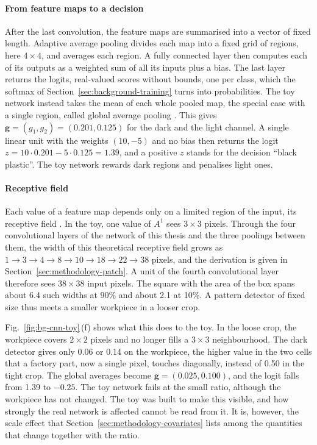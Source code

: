 \paragraph{From feature maps to a decision}
After the last convolution, the feature maps are summarised into a vector of fixed
length. Adaptive average pooling divides each map into a fixed grid of regions, here
$4 \times 4$, and averages each region. A fully connected layer then computes each of
its outputs as a weighted sum of all its inputs plus a bias. The last layer returns the
logits, real-valued scores without bounds, one per class, which the softmax of
Section~\ref{sec:background-training} turns into probabilities. The toy network instead
takes the mean of each whole pooled map, the special case with a single region, called
global average pooling \citep{lin2014network}. This gives
$\bm{g} = (g_1, g_2) = (0.201, 0.125)$ for the dark and the light channel. A single linear
unit with the weights $(10, -5)$ and no bias then returns the logit
$z = 10 \cdot 0.201 - 5 \cdot 0.125 = 1.39$, and a positive $z$ stands for the decision
``black plastic''. The toy network rewards dark regions and penalises light
ones.

\paragraph{Receptive field}
Each value of a feature map depends only on a limited region of the input, its receptive
field \citep{araujo2019computing}. In the toy, one value of $A^1$ sees $3 \times 3$
pixels. Through the four
convolutional layers of the network of this thesis and the three poolings between them,
the width of this theoretical receptive field grows as
$1 \to 3 \to 4 \to 8 \to 10 \to 18 \to 22 \to 38$ pixels, and the
derivation is given in Section~\ref{sec:methodology-patch}. A unit of the fourth
convolutional layer therefore sees $38 \times 38$ input pixels. The square with the area
of the box spans about 6.4 such widths at 90\% and about 2.1 at 10\%. A pattern detector
of fixed size thus meets a smaller workpiece in a looser crop.

Fig.~\ref{fig:bg-cnn-toy}\,(f) shows what this does to the toy. In the loose crop, the
workpiece covers $2 \times 2$ pixels and no longer fills a $3 \times 3$ neighbourhood.
The dark detector gives only 0.06 or 0.14 on the workpiece, the higher value in the two
cells that a factory part, now a single pixel, touches diagonally, instead of 0.50 in the
tight crop. The global averages become $\bm{g} = (0.025, 0.100)$, and the logit falls from
1.39 to $-0.25$. The toy network fails at the small ratio, although the workpiece has not changed. The
toy was built to make this visible, and how strongly the real network is affected cannot
be read from it. It is, however, the scale effect that Section~\ref{sec:methodology-covariates} lists among the
quantities that change together with the ratio.

